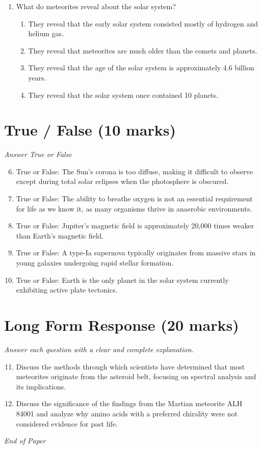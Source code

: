 \documentclass[12pt]{article}
\begin{document}
\begin{enumerate}[label=\arabic*.]
\begin{enumerate}[label=(\alph*)]
    \item 1.5 x 1014 meters
    \item 1.5 x 1017 meters
\end{enumerate}
\item What do meteorites reveal about the solar system?
\begin{enumerate}[label=(\alph*)]
    \item They reveal that the early solar system consisted mostly of hydrogen and helium gas.
    \item They reveal that meteorites are much older than the comets and planets.
    \item They reveal that the age of the solar system is approximately 4.6 billion years.
    \item They reveal that the solar system once contained 10 planets.
\end{enumerate}
\end{enumerate}

\section*{True / False (10 marks)}
\textit{Answer True or False}
\begin{enumerate}[label=\arabic*.]
\setcounter{enumi}{5}
\item True or False: The Sun's corona is too diffuse, making it difficult to observe except during total solar eclipses when the photosphere is obscured.
\item True or False: The ability to breathe oxygen is not an essential requirement for life as we know it, as many organisms thrive in anaerobic environments.
\item True or False: Jupiter's magnetic field is approximately 20,000 times weaker than Earth's magnetic field.
\item True or False: A type-Ia supernova typically originates from massive stars in young galaxies undergoing rapid stellar formation.
\item True or False: Earth is the only planet in the solar system currently exhibiting active plate tectonics.
\end{enumerate}

\section*{Long Form Response (20 marks)}
\textit{Answer each question with a clear and complete explanation.}
\begin{enumerate}[label=\arabic*.]
\setcounter{enumi}{10}
\item Discuss the methods through which scientists have determined that most meteorites originate from the asteroid belt, focusing on spectral analysis and its implications.
\item Discuss the significance of the findings from the Martian meteorite ALH 84001 and analyze why amino acids with a preferred chirality were not considered evidence for past life.
\end{enumerate}

\vfill
\noindent\textit{End of Paper}
\end{document}
